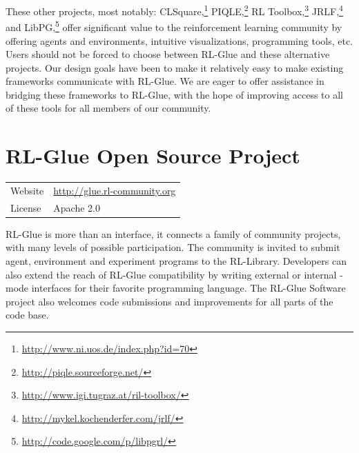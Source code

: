 \documentclass[twoside,11pt]{article}
\begin{document}
These other projects, most notably: CLSquare,\footnote{\url{http://www.ni.uos.de/index.php?id=70}}  PIQLE,\footnote{\url{http://piqle.sourceforge.net/}} RL Toolbox,\footnote{\url{http://www.igi.tugraz.at/ril-toolbox/}
} JRLF,\footnote{\url{http://mykel.kochenderfer.com/jrlf/}}  and LibPG,\footnote{\url{http://code.google.com/p/libpgrl/}} offer significant value to the reinforcement learning community by offering agents and environments, intuitive visualizations, programming tools, etc.  Users should not be forced to choose between RL-Glue and these alternative projects. Our design goals have been to make it relatively easy to make existing frameworks communicate with RL-Glue.  We are eager to offer assistance in bridging these frameworks to RL-Glue, with the hope of improving access to all of these tools for all members of our community.





 
 
 
\section{RL-Glue Open Source Project}
\begin{tabular}{ l l }
  Website &  \url{http://glue.rl-community.org} \\
  License & Apache 2.0  \\
\end{tabular}
\newline
\newline
RL-Glue is more than an interface, it connects a family of community projects, with many levels of possible participation. The community is invited to submit agent, environment and experiment programs to the RL-Library. Developers can also extend the reach of RL-Glue compatibility by writing external or internal -mode interfaces for their favorite programming language.  The RL-Glue Software project also welcomes code submissions and improvements for all parts of the code base.  

\end{document}
